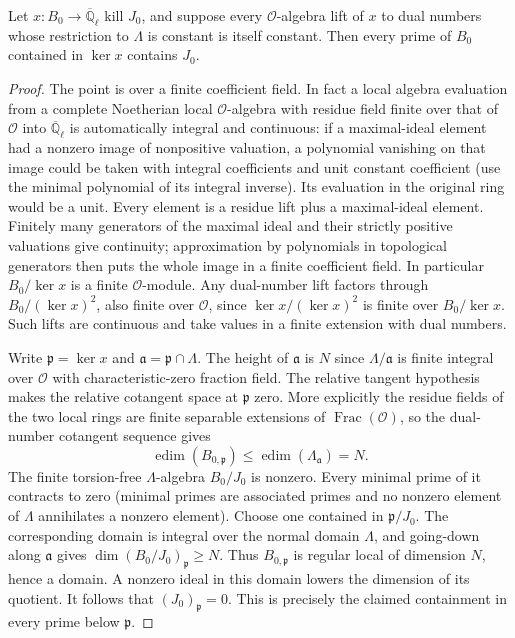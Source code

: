 \begin{lemma}
\label{lem:rh-four-tangent-support}
Let $x:B_0\to\overline{\mathbb Q}_\ell$ kill $J_0$, and suppose every
$\mathcal O$-algebra lift of $x$ to dual numbers whose restriction to
$\Lambda$ is constant is itself constant. Then every prime of $B_0$
contained in $\ker x$ contains $J_0$.
\end{lemma}
\begin{proof}
The point is over a finite coefficient field. In fact a local algebra
evaluation from a complete Noetherian local $\mathcal O$-algebra with
residue field finite over that of $\mathcal O$ into
$\overline{\mathbb Q}_\ell$ is automatically integral and continuous:
if a maximal-ideal element had a nonzero image of nonpositive
valuation, a polynomial vanishing on that image could be taken with
integral coefficients and unit constant coefficient (use the minimal
polynomial of its integral inverse). Its evaluation in the original
ring would be a unit. Every element is a residue lift plus a
maximal-ideal element. Finitely many generators of the maximal ideal
and their strictly positive valuations give continuity; approximation
by polynomials in topological generators then puts the whole image in
a finite coefficient field. In particular $B_0/\ker x$ is a finite
$\mathcal O$-module. Any dual-number lift factors through
$B_0/(\ker x)^2$, also finite over $\mathcal O$, since
$\ker x/(\ker x)^2$ is finite over $B_0/\ker x$.
Such lifts are continuous and take values in a finite extension with
dual numbers.

Write $\mathfrak p=\ker x$ and $\mathfrak a=\mathfrak p\cap\Lambda$.
The height of $\mathfrak a$ is $N$ since
$\Lambda/\mathfrak a$ is finite integral over $\mathcal O$ with
characteristic-zero fraction field. The relative tangent hypothesis
makes the relative cotangent space at $\mathfrak p$ zero. More
explicitly the residue fields of the two local rings are finite
separable extensions of $\operatorname{Frac}(\mathcal O)$, so the
dual-number cotangent sequence gives
\[
 \operatorname{edim}(B_{0,\mathfrak p})
          \leq\operatorname{edim}(\Lambda_{\mathfrak a})=N.
\]
The finite torsion-free $\Lambda$-algebra $B_0/J_0$ is nonzero.
Every minimal prime of it contracts to zero (minimal primes are
associated primes and no nonzero element of $\Lambda$ annihilates
a nonzero element). Choose one contained in $\mathfrak p/J_0$.
The corresponding domain is integral over the normal domain
$\Lambda$, and going-down along $\mathfrak a$ gives
$\dim (B_0/J_0)_{\mathfrak p}\geq N$. Thus $B_{0,\mathfrak p}$
is regular local of dimension $N$, hence a domain.
A nonzero ideal in this domain lowers the dimension of its quotient.
It follows that $(J_0)_{\mathfrak p}=0$. This is precisely the claimed
containment in every prime below $\mathfrak p$.
\end{proof}

